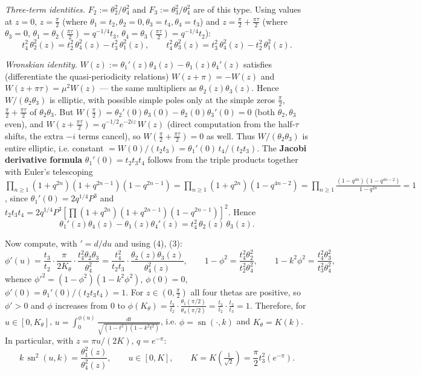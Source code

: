 \documentclass[11pt]{article}
\theoremstyle{remark}
\begin{document}
\textit{Three-term identities.} $F_2:=\theta_2^2/\theta_4^2$ and $F_3:=\theta_3^2/\theta_4^2$ are of this type. Using values at $z=0$, $z=\tfrac\pi2$ (where $\theta_1=t_2,\theta_2=0,\theta_3=t_4,\theta_4=t_3$) and $z=\tfrac\pi2+\tfrac{\pi\tau}2$ (where $\theta_3=0$, $\theta_1=\theta_2(\tfrac{\pi\tau}2)=q^{-1/4}t_3$, $\theta_4=\theta_3(\tfrac{\pi\tau}2)=q^{-1/4}t_2$):
\begin{equation*}
t_4^2\,\theta_2^2(z)=t_2^2\,\theta_4^2(z)-t_3^2\,\theta_1^2(z),\qquad
t_4^2\,\theta_3^2(z)=t_3^2\,\theta_4^2(z)-t_2^2\,\theta_1^2(z). \tag{3}
\end{equation*}

\textit{Wronskian identity.} $W(z):=\theta_1'(z)\theta_4(z)-\theta_1(z)\theta_4'(z)$ satisfies (differentiate the quasi-periodicity relations) $W(z+\pi)=-W(z)$ and $W(z+\pi\tau)=\mu^2W(z)$ --- the same multipliers as $\theta_2(z)\theta_3(z)$. Hence $W/(\theta_2\theta_3)$ is elliptic, with possible simple poles only at the simple zeros $\tfrac\pi2$, $\tfrac\pi2+\tfrac{\pi\tau}2$ of $\theta_2\theta_3$. But $W(\tfrac\pi2)=\theta_2'(0)\theta_3(0)-\theta_2(0)\theta_3'(0)=0$ (both $\theta_2,\theta_3$ even), and $W(z+\tfrac{\pi\tau}2)=q^{-1/2}e^{-2iz}\,W(z)$ (direct computation from the half-$\tau$ shifts, the extra $-i$ terms cancel), so $W(\tfrac\pi2+\tfrac{\pi\tau}2)=0$ as well. Thus $W/(\theta_2\theta_3)$ is entire elliptic, i.e. constant $=W(0)/(t_2t_3)=\theta_1'(0)\,t_4/(t_2t_3)$. The \textbf{Jacobi derivative formula} $\theta_1'(0)=t_2t_3t_4$ follows from the triple products together with Euler's telescoping
$\prod_{n\ge1}(1+q^{2n})(1+q^{2n-1})(1-q^{2n-1})=\prod_{n\ge1}(1+q^{2n})(1-q^{4n-2})=\prod_{n\ge1}\frac{(1-q^{4n})(1-q^{4n-2})}{1-q^{2n}}=1$,
since $\theta_1'(0)=2q^{1/4}P^3$ and $t_2t_3t_4=2q^{1/4}P^3\left[\prod(1+q^{2n})(1+q^{2n-1})(1-q^{2n-1})\right]^2$. Hence
\begin{equation*}
\theta_1'(z)\theta_4(z)-\theta_1(z)\theta_4'(z)=t_4^2\,\theta_2(z)\,\theta_3(z). \tag{4}
\end{equation*}

Now compute, with $'=d/du$ and using (4), (3):
\[\phi'(u)=\frac{t_3}{t_2}\cdot\frac{\pi}{2K_\theta}\cdot\frac{t_4^2\theta_2\theta_3}{\theta_4^2}
=\frac{t_4^2}{t_2t_3}\cdot\frac{\theta_2(z)\theta_3(z)}{\theta_4^2(z)},\qquad
1-\phi^2=\frac{t_4^2\theta_2^2}{t_2^2\theta_4^2},\qquad 1-k^2\phi^2=\frac{t_4^2\theta_3^2}{t_3^2\theta_4^2},\]
whence $\phi'^2=(1-\phi^2)(1-k^2\phi^2)$, $\phi(0)=0$, $\phi'(0)=\theta_1'(0)/(t_2t_3t_4)=1$. For $z\in(0,\tfrac\pi2)$ all four thetas are positive, so $\phi'>0$ and $\phi$ increases from $0$ to $\phi(K_\theta)=\frac{t_3}{t_2}\cdot\frac{\theta_1(\pi/2)}{\theta_4(\pi/2)}=\frac{t_3}{t_2}\cdot\frac{t_2}{t_3}=1$. Therefore, for $u\in[0,K_\theta]$, $u=\int_0^{\phi(u)}\frac{dt}{\sqrt{(1-t^2)(1-k^2t^2)}}$, i.e. $\phi=\operatorname{sn}(\cdot,k)$ and $K_\theta=K(k)$. In particular, with $z=\pi u/(2K)$, $q=e^{-\pi}$:
\begin{equation*}
k\,\operatorname{sn}^2(u,k)=\frac{\theta_1^2(z)}{\theta_4^2(z)},\qquad u\in[0,K],\qquad K=K(\tfrac{1}{\sqrt2})=\frac\pi2 t_3^2(e^{-\pi}). \tag{5}
\end{equation*}
\end{document}
